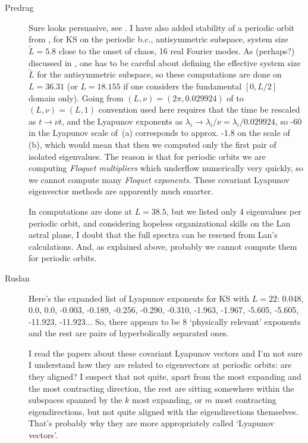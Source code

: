 \begin{description}
\item[Predrag]
Sure looks persuasive, see . I have also
added stability of a periodic orbit from
, for KS on the periodic b.c.,
antisymmetric subspace, system size $\tilde{L} = 5.8$ close
to the onset of chaos, 16 real Fourier modes. As (perhaps?)
discussed in , one has to be careful about
defining the effective system size $\tilde{L}$ for the
antisymmetric subspace, so these computations are done on
$L=36.31$ (or $L = 18.155$ if one considers the fundamental
$[0,L/2]$ domain only). Going from $(L,\nu) =
(2\pi,0.029924)$ of  to $(L,\nu) =
(L,1)$ convention used here requires that the time be
rescaled as $t \to \nu t$, and the Lyapunov exponents as
$\lambda_i \to \lambda_i/ \nu = \lambda_i/ 0.029924 $, so -60
in the Lyapunov scale of \,(a)
corresponds to approx. -1.8 on the scale of
\,(b), which would mean that then we
computed only the first pair of isolated eigenvalues. The
reason is that for periodic orbits we are computing {\em
Floquet multipliers} which underflow numerically very
quickly, so we cannot compute many {\em Floquet exponents}.
These covariant Lyapunov eigenvector methods are apparently
much smarter.

In  computations are done at $L = 38.5$,
but we listed only 4 eigenvalues per periodic orbit, and
considering hopeless organizational skills on the Lan astral
plane, I doubt that the full spectra can be rescued from
Lan's calculations. And, as explained above, probably we cannot
compute them for periodic orbits.

\item[Ruslan]
 Here's the expanded list of Lyapunov exponents for KS with $L = 22$:
 0.048,    0.0,    0.0,   -0.003,   -0.189,   -0.256,   -0.290,   -0.310,
-1.963,   -1.967,   -5.605,   -5.605,  -11.923,  -11.923...
So, there appears to be 8 `physically relevant' exponents and
the rest are pairs of hyperbolically separated ones.

I read
the papers about these covariant Lyapunov vectors and I'm not
sure I understand how they are related to eigenvectors at
periodic orbits: are they aligned?  I suspect that not quite,
apart from the most expanding and the most contracting
direction, the rest are sitting somewhere within the
subspaces spanned by the $k$ most expanding, or $m$ most
contracting eigendirections, but not quite aligned with the
eigendirections themselves.  That's probably why they are
more appropriately called `Lyapunov vectors'.


\end{description}
